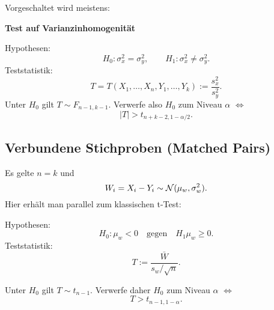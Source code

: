 Vorgeschaltet wird meistens:
\begin{mdframed}
  \textbf{Test auf Varianzinhomogenität}

  Hypothesen:
  \[ H_0 : \sigma_x^2 = \sigma_y^2, \qquad H_1 : \sigma_x^2 \ne \sigma_y^2. \]
  Teststatistik:
  \[ T = T(X_1, \ldots, X_n, Y_1, \ldots, Y_k) := \frac{s_x^2}{s_y^2}. \]
  Unter $H_0$ gilt $T \sim  F_{n-1,k-1}$. Verwerfe also $H_0$ zum Niveau
  $\alpha$ $\Leftrightarrow$
  \[ |T| > t_{n+k-2,1 - \alpha/2}. \]
\end{mdframed}

\subsection{Verbundene Stichproben (Matched Pairs)}
Es gelte $n=k$ und
\[ W_i = X_i - Y_i \sim \mathcal{N}(\mu_w,\sigma_w^2). \]
Hier erhält man parallel zum klassischen t-Test:

\begin{mdframed}
  Hypothesen:
  \[ H_0 : \mu_w < 0 \quad \text{gegen} \quad H_1 \mu_w \ge 0. \]
  Teststatistik:
  \[ T := \frac{\bar{W}}{s_w / \sqrt{n}}. \]
  
  Unter $H_0$ gilt $T \sim t_{n-1}$. Verwerfe daher $H_0$ zum Niveau $\alpha$
  $\Leftrightarrow$
  \[ T > t_{n-1,1-\alpha}. \]
\end{mdframed}